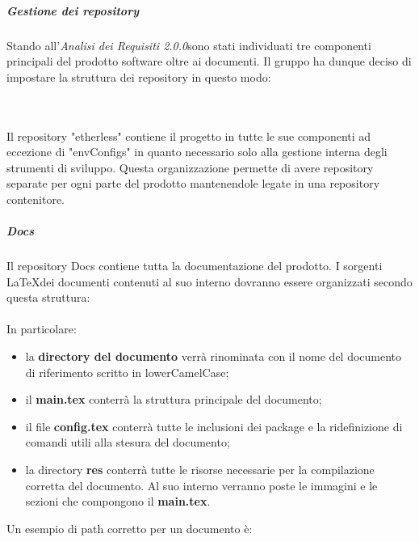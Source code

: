 \subparagraph*{Gestione dei repository}
Stando all'\textit{Analisi dei Requisiti 2.0.0}\doc sono stati individuati
tre componenti principali del prodotto software oltre ai documenti.
Il gruppo ha dunque deciso di impostare la struttura dei repository in questo modo:\\\\

\vspace{1cm}

\noindent \\Il repository "etherless" contiene il progetto in tutte le sue componenti
ad eccezione di "envConfigs" in quanto necessario solo alla gestione interna
degli strumenti di sviluppo. Questa organizzazione permette di avere repository separate per ogni parte
del prodotto mantenendole legate in una repository contenitore.

\subparagraph*{Docs}
Il repository Docs contiene tutta la documentazione del prodotto. I sorgenti \LaTeX \space dei documenti contenuti al suo interno dovranno essere organizzati secondo questa struttura:\\\\

\vspace{1cm}
\noindent In particolare:
\begin{itemize}
	\item la \textbf{directory del documento} verrà rinominata con il nome del documento di riferimento scritto in lowerCamelCase;
	\item il \textbf{main.tex} conterrà la struttura principale del documento;
	\item il file \textbf{config.tex} conterrà tutte le inclusioni dei package e la ridefinizione di comandi utili alla stesura del documento;
	\item la directory \textbf{res} conterrà tutte le risorse necessarie per la compilazione corretta del documento. Al suo interno verranno poste le immagini e le sezioni che compongono il \textbf{main.tex}.
\end{itemize}
Un esempio di path corretto per un documento è:\\

\centerline{}
\vspace{0.7cm}

